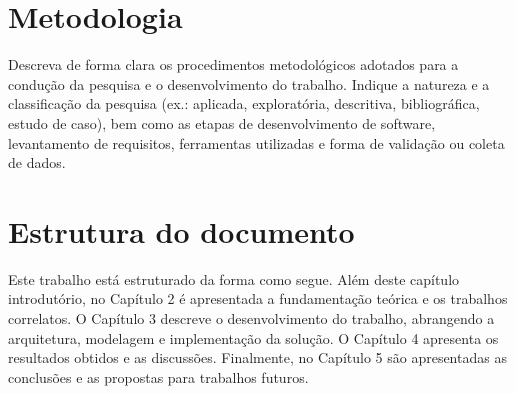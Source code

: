 \section{Metodologia}
Descreva de forma clara os procedimentos metodológicos adotados para a condução da pesquisa e o desenvolvimento do trabalho. Indique a natureza e a classificação da pesquisa (ex.: aplicada, exploratória, descritiva, bibliográfica, estudo de caso), bem como as etapas de desenvolvimento de software, levantamento de requisitos, ferramentas utilizadas e forma de validação ou coleta de dados.

\section{Estrutura do documento}
Este trabalho está estruturado da forma como segue. Além deste capítulo introdutório, no Capítulo 2 é apresentada a fundamentação teórica e os trabalhos correlatos. O Capítulo 3 descreve o desenvolvimento do trabalho, abrangendo a arquitetura, modelagem e implementação da solução. O Capítulo 4 apresenta os resultados obtidos e as discussões. Finalmente, no Capítulo 5 são apresentadas as conclusões e as propostas para trabalhos futuros.
